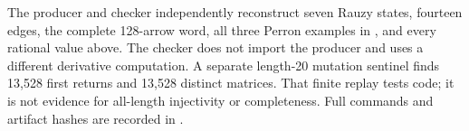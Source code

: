 The producer and checker independently reconstruct seven Rauzy states,
fourteen edges, the complete 128-arrow word, all three Perron examples in
, and every rational value above.  The checker
does not import the producer and uses a different derivative computation.
A separate length-20 mutation sentinel finds 13,528 first returns and 13,528
distinct matrices.  That finite replay tests code; it is not evidence for
all-length injectivity or completeness.  Full commands and artifact hashes
are recorded in .
